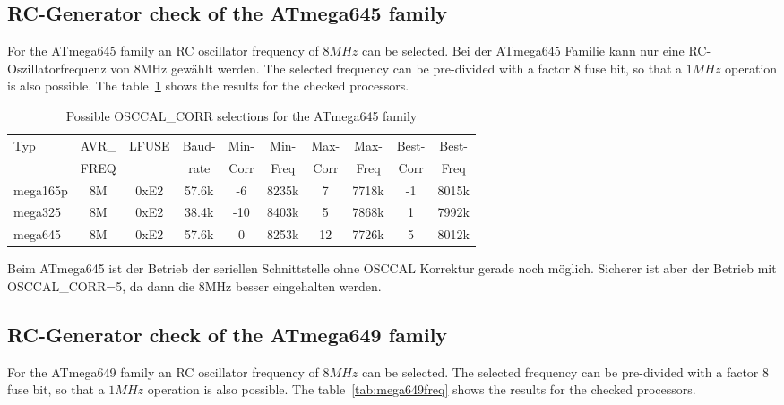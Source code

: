 \subsection{RC-Generator check of the ATmega645 family}

For the ATmega645 family an RC oscillator frequency of \(8MHz\) can be selected.
Bei der ATmega645 Familie kann nur eine RC-Oszillatorfrequenz von 8MHz gewählt werden.
The selected frequency can be pre-divided with a factor 8 fuse bit,
so that a \(1MHz\) operation is also possible.
The table~\ref{tab:mega645freq} shows the results for the checked processors.

\begin{table}[H]
  \begin{center}
    \begin{tabular}{| l | c | c | c || c | c || c | c || c | c |}
    \hline
   Typ  &       AVR\_ & LFUSE & Baud- & Min- & Min- & Max- & Max- & Best- & Best-  \\
        &       FREQ  &       & rate & Corr & Freq & Corr & Freq  & Corr  & Freq  \\
    \hline
    \hline
mega165p &         8M & 0xE2  & 57.6k & -6  & 8235k &  7  & 7718k  & -1  & 8015k \\
    \hline
mega325  &         8M & 0xE2  & 38.4k & -10 & 8403k &  5  & 7868k  &  1  & 7992k \\
    \hline
mega645 &          8M & 0xE2  & 57.6k &  0  & 8253k & 12  & 7726k  & 5  & 8012k \\
    \hline
    \end{tabular}
  \end{center}
  \caption{Possible OSCCAL\_CORR selections for the ATmega645 family}
  \label{tab:mega645freq}
\end{table}

Beim ATmega645 ist der Betrieb der seriellen Schnittstelle ohne OSCCAL Korrektur gerade noch möglich.
Sicherer ist aber der Betrieb mit OSCCAL\_CORR=5, da dann die 8MHz besser eingehalten werden. 

\subsection{RC-Generator check of the ATmega649 family}

For the ATmega649 family an RC oscillator frequency of \(8MHz\) can be selected.
The selected frequency can be pre-divided with a factor 8 fuse bit,
so that a \(1MHz\) operation is also possible.
The table~\ref{tab:mega649freq} shows the results for the checked processors.

